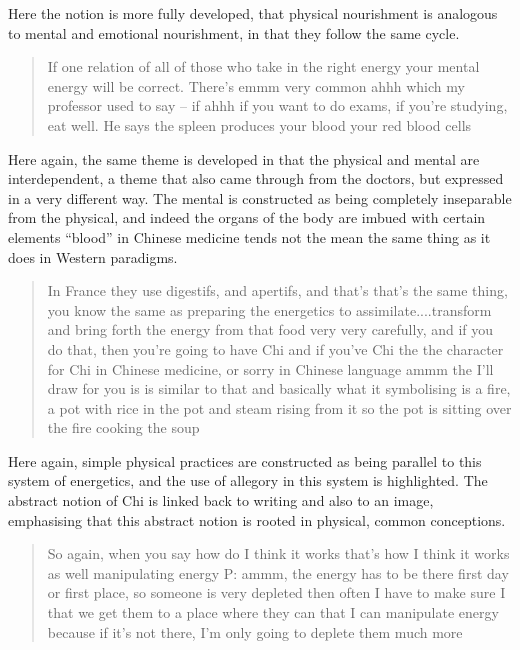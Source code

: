 Here the notion is more fully developed, that physical nourishment is analogous to mental and emotional nourishment, in that they follow the same cycle. 


\begin{quotation}
  If one relation of all of those who take in the right energy your mental energy will be correct. There's emmm very common ahhh which my professor used to say – if ahhh if you want to do exams, if you're studying, eat well. He says the spleen produces your blood your red blood cells 

\end{quotation}

Here again, the same theme is developed in that the physical and mental are interdependent, a theme that also came through from the doctors, but expressed in a very different way. The mental is constructed as being completely inseparable from the physical, and indeed the organs of the body are imbued with certain elements ``blood'' in Chinese medicine tends not the mean the same thing as it does in Western paradigms. 

\begin{quotation}
   In France they use digestifs, and apertifs, and that's that's the same thing, you know the same as preparing the energetics to assimilate....transform and bring forth the energy from that food very very carefully, and if you do that, then you're going to have Chi and if you've Chi the the character for Chi in Chinese medicine, or sorry in Chinese language ammm the I'll draw for you is is similar to that and basically what it symbolising is a fire, a pot with rice in the pot and steam rising from it so the pot is sitting over the fire cooking the soup 

\end{quotation}

Here again, simple physical practices are constructed as being parallel to this system of energetics, and the use of allegory in this system is highlighted. The abstract notion of Chi is linked back to writing and also to an image, emphasising that this abstract notion is rooted in physical, common conceptions. 


\begin{quotation}
  So again, when you say how do I think it works that's how I think it works as well manipulating energy
P: ammm, the energy has to be there first day or first place, so someone is very depleted then often I have to make sure I that we get them to a place where they can that I can manipulate energy because if it's not there, I'm only going to deplete them much more


\end{quotation}

